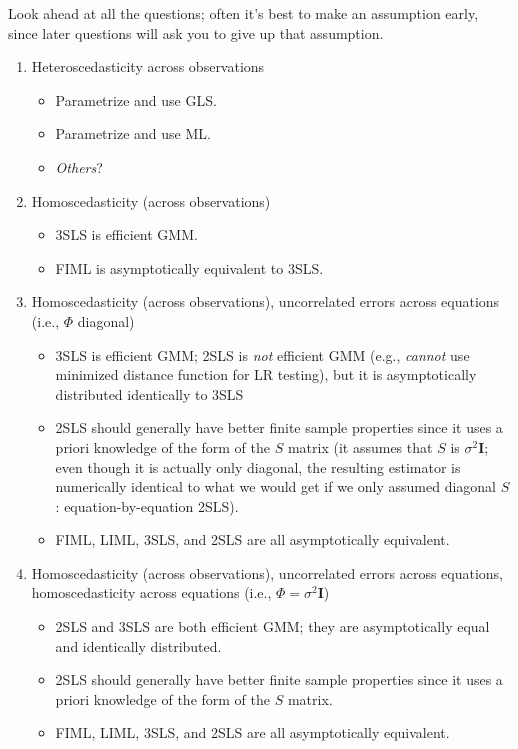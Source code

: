 \documentclass[8pt,letterpaper, landscape]{extarticle} %
\newcommand{\mI}{\ensuremath{\mathbf{I}}}
\begin{document}
\begin{multicols}{3}
\begin{description}
Look ahead at all the questions; often it's best to make an assumption early, since later questions will ask you to give up that assumption.
\begin{enumerate}
\item Heteroscedasticity across observations
\begin{itemize}
\item Parametrize and use GLS.
\item Parametrize and use ML.
\item \textit{Others}?
\end{itemize}
\item Homoscedasticity (across observations)
\begin{itemize}
\item 3SLS is efficient GMM.
\item FIML is asymptotically equivalent to 3SLS.
\end{itemize}
\item Homoscedasticity (across observations), uncorrelated errors across equations (i.e., $ \Phi $ diagonal)
\begin{itemize}
\item 3SLS is efficient GMM; 2SLS is \textit{not} efficient GMM (e.g., \textit{cannot} use minimized distance function for LR testing), but it is asymptotically distributed identically to 3SLS
\item 2SLS should generally have better finite sample properties since it uses a priori knowledge of the form of the $ S $ matrix (it assumes that $ S $ is $ \sigma^2 \mI $; even though it is actually only diagonal, the resulting estimator is numerically identical to what we would get if we only assumed diagonal $ S $: equation-by-equation 2SLS).
\item FIML, LIML, 3SLS, and 2SLS are all asymptotically equivalent.
\end{itemize}
\item Homoscedasticity (across observations), uncorrelated errors across equations, homoscedasticity across equations (i.e., $ \Phi = \sigma^2 \mI $)
\begin{itemize}
\item 2SLS and 3SLS are both efficient GMM; they are asymptotically equal and identically distributed.
\item 2SLS should generally have better finite sample properties since it uses a priori knowledge of the form of the $ S $ matrix.
\item FIML, LIML, 3SLS, and 2SLS are all asymptotically equivalent.
\end{itemize}
\end{enumerate}


\end{description}
\end{multicols}
\end{document}
